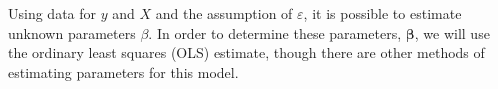 Using data for $y$ and $X$ and the assumption of $\varepsilon$, it is possible to estimate unknown parameters $\beta$. 
In order to determine these parameters, $\boldsymbol{\beta}$, we will use the ordinary least squares (OLS) estimate, though there are other methods of estimating parameters for this model. 





